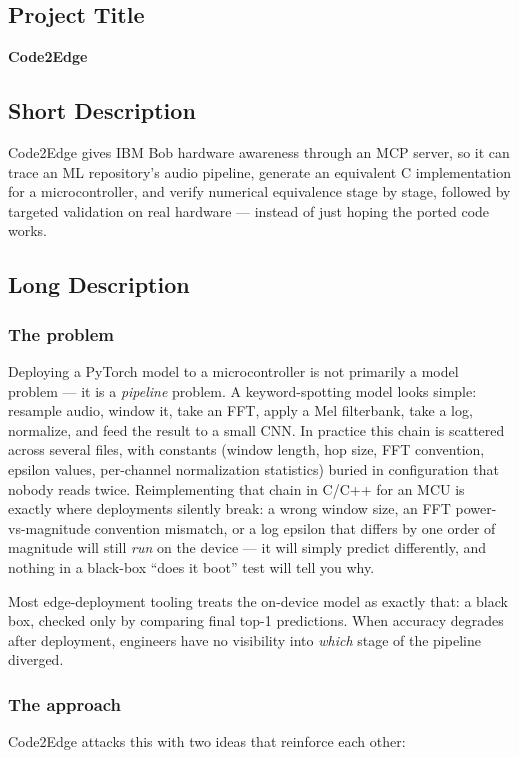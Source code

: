 \documentclass[11pt,a4paper]{article}
\begin{document}
\subsection{Project Title}
\textbf{Code2Edge}

\subsection{Short Description}
\begin{infobox}
Code2Edge gives IBM Bob hardware awareness through an MCP server, so it can
trace an ML repository's audio pipeline, generate an equivalent C
implementation for a microcontroller, and verify numerical equivalence
stage by stage, followed by targeted validation on real hardware --- instead
of just hoping the ported code works.
\end{infobox}

\subsection{Long Description}

\subsubsection{The problem}
Deploying a PyTorch model to a microcontroller is not primarily a model
problem --- it is a \emph{pipeline} problem. A keyword-spotting model looks
simple: resample audio, window it, take an FFT, apply a Mel filterbank,
take a log, normalize, and feed the result to a small CNN. In practice this
chain is scattered across several files, with constants (window length, hop
size, FFT convention, epsilon values, per-channel normalization statistics)
buried in configuration that nobody reads twice. Reimplementing that chain
in C/C++ for an MCU is exactly where deployments silently break: a wrong
window size, an FFT power-vs-magnitude convention mismatch, or a log
epsilon that differs by one order of magnitude will still \emph{run} on the
device --- it will simply predict differently, and nothing in a
black-box ``does it boot'' test will tell you why.

Most edge-deployment tooling treats the on-device model as exactly that: a
black box, checked only by comparing final top-1 predictions. When accuracy
degrades after deployment, engineers have no visibility into \emph{which}
stage of the pipeline diverged.

\subsubsection{The approach}
Code2Edge attacks this with two ideas that reinforce each other:
\end{document}
